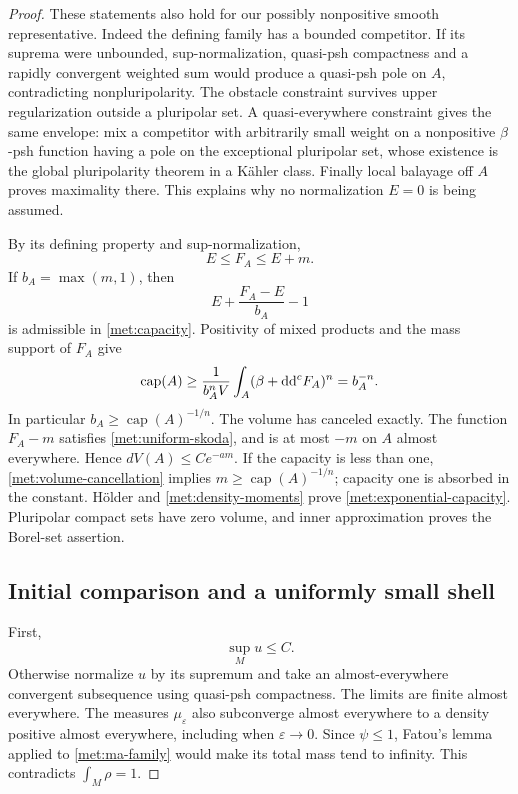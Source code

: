 \begin{proof}
These statements also hold for our possibly nonpositive smooth
representative.  Indeed the defining family has a bounded competitor.
If its suprema were unbounded, sup-normalization, quasi-psh compactness
and a rapidly convergent weighted sum would produce a quasi-psh pole
on \(A\), contradicting nonpluripolarity.  The obstacle constraint
survives upper regularization outside a pluripolar set.  A
quasi-everywhere constraint gives the same envelope: mix a competitor
with arbitrarily small weight on a nonpositive \(\beta\)-psh function
having a pole on the exceptional pluripolar set, whose existence is
the global pluripolarity theorem in a K\"ahler class.  Finally local
balayage off \(A\) proves maximality there.  This explains why no
normalization \(E=0\) is being assumed.

By its defining property and sup-normalization,
\[
 E\leq F_A\leq E+m.
\]
If \(b_A=\max(m,1)\), then
\[
 E+\frac{F_A-E}{b_A}-1
\]
is admissible in \eqref{met:capacity}.  Positivity of mixed products
and the mass support of \(F_A\) give
\begin{equation}
 \label{met:volume-cancellation}
 \operatorname{cap}(A)
 \geq\frac{1}{b_A^nV}\int_A(\beta+\mathrm{d}\mathrm{d}^{c} F_A)^n
 =b_A^{-n}.
\end{equation}
In particular \(b_A\geq\operatorname{cap}(A)^{-1/n}\).  The volume
has canceled exactly.  The function \(F_A-m\) satisfies
\eqref{met:uniform-skoda}, and is at most \(-m\) on \(A\) almost
everywhere.  Hence \(dV(A)\leq C e^{-a m}\).  If the capacity is less
than one, \eqref{met:volume-cancellation} implies
\(m\geq\operatorname{cap}(A)^{-1/n}\); capacity one is absorbed in the
constant.  H\"older and \eqref{met:density-moments} prove
\eqref{met:exponential-capacity}.  Pluripolar compact sets have zero
volume, and inner approximation proves the Borel-set assertion.

\subsection*{Initial comparison and a uniformly small shell}

First,
\begin{equation}
 \label{met:upper-u}
 \sup_M u\leq C.
\end{equation}
Otherwise normalize \(u\) by its supremum and take an almost-everywhere
convergent subsequence using quasi-psh compactness.  The limits are
finite almost everywhere.  The measures \(\mu_\varepsilon\) also
subconverge almost everywhere to a density positive almost everywhere,
including when \(\varepsilon\to0\).  Since \(\psi\leq1\), Fatou's
lemma applied to \eqref{met:ma-family} would make its total mass tend
to infinity.  This contradicts \(\int_M\rho=1\).


\end{proof}
